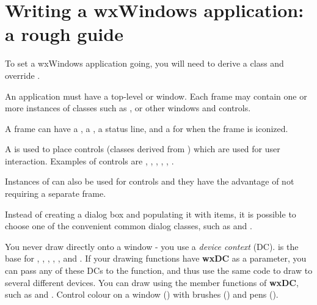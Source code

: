 \section{Writing a wxWindows application: a rough guide}\label{roughguide}

To set a wxWindows application going, you will need to derive a  class and
override .

An application must have a top-level  or  window.
Each frame may contain one or more instances of classes such as , \rtfsp
or other windows and controls.

A frame can have a , a , a status line, and a  for
when the frame is iconized.

A  is used to place controls (classes derived from )
which are used for user interaction. Examples of controls are ,
\rtfsp{}, , ,
\rtfsp{}, .

Instances of  can also be used for controls and they have
the advantage of not requiring a separate frame.

Instead of creating a dialog box and populating it with items, it is possible to choose
one of the convenient common dialog classes, such as \rtfsp
and .

You never draw directly onto a window - you use a {\it device context} (DC).  is
the base for , , , ,
\rtfsp{},  and .
If your drawing functions have {\bf wxDC} as a parameter, you can pass any of these DCs
to the function, and thus use the same code to draw to several different devices.
You can draw using the member functions of {\bf wxDC}, such as \rtfsp
and . Control colour on a window () with
brushes () and pens ().

